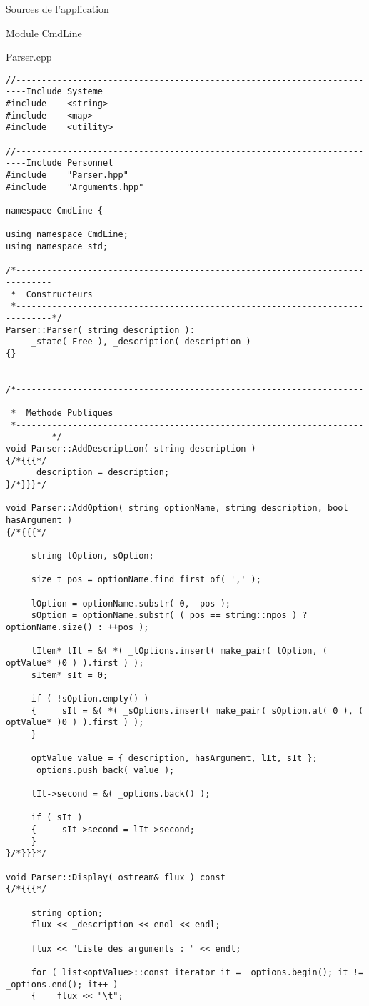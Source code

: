 \documentclass{article}
\begin{document}
\begin{section}{Sources de l'application}
\begin{subsection}{Module CmdLine}
\begin{paragraph}{Parser.cpp}
\begin{verbatim}
//------------------------------------------------------------------------Include Systeme
#include    <string>
#include    <map>
#include    <utility>

//------------------------------------------------------------------------Include Personnel
#include    "Parser.hpp"
#include    "Arguments.hpp"

namespace CmdLine {

using namespace CmdLine;
using namespace std;

/*-----------------------------------------------------------------------------
 *  Constructeurs
 *-----------------------------------------------------------------------------*/
Parser::Parser( string description ):
     _state( Free ), _description( description )
{}


/*-----------------------------------------------------------------------------
 *  Methode Publiques
 *-----------------------------------------------------------------------------*/
void Parser::AddDescription( string description )
{/*{{{*/
     _description = description;
}/*}}}*/

void Parser::AddOption( string optionName, string description, bool hasArgument )
{/*{{{*/

     string lOption, sOption;

     size_t pos = optionName.find_first_of( ',' );

     lOption = optionName.substr( 0,  pos );
     sOption = optionName.substr( ( pos == string::npos ) ? optionName.size() : ++pos );

     lItem* lIt = &( *( _lOptions.insert( make_pair( lOption, ( optValue* )0 ) ).first ) );
     sItem* sIt = 0;

     if ( !sOption.empty() ) 
     {	   sIt = &( *( _sOptions.insert( make_pair( sOption.at( 0 ), ( optValue* )0 ) ).first ) );
     }

     optValue value = { description, hasArgument, lIt, sIt };
     _options.push_back( value );

     lIt->second = &( _options.back() );

     if ( sIt ) 
     {     sIt->second = lIt->second;
     }
}/*}}}*/

void Parser::Display( ostream& flux ) const
{/*{{{*/

     string option;
     flux << _description << endl << endl;

     flux << "Liste des arguments : " << endl;

     for ( list<optValue>::const_iterator it = _options.begin(); it != _options.end(); it++ ) 
     {    flux << "\t";


\end{verbatim}
\end{paragraph}
\end{subsection}
\end{section}
\end{document}
